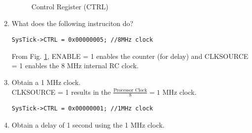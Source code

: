 \documentclass[journal,12pt,twocolumn]{IEEEtran}
\renewcommand\thesection{\arabic{section}}
\renewcommand\thesubsection{\thesection.\arabic{subsection}}
\begin{document}
\begin{enumerate}[label=\thesubsection.\arabic*.,ref=\thesubsection.\theenumi]
\begin{figure}[!ht]
\caption{Control Register (CTRL)}
\label{fig:systick_ctrl}
\end{figure}
\item What does the following instruciton do?
\begin{lstlisting}
SysTick->CTRL = 0x00000005;	//8MHz clock
\end{lstlisting}
\solution From Fig. \ref{fig:systick_ctrl}, ENABLE = 1 enables the counter (for delay) and CLKSOURCE = 1 enables the 8 MHz internal RC clock.
\item Obtain a 1 MHz clock. 
\\
\solution CLKSOURCE = 1 results in the $\frac{\text{Processor Clock}}{8} = 1$ MHz clock.
\begin{lstlisting}
SysTick->CTRL = 0x00000001;	//1MHz clock
\end{lstlisting}
\item Obtain a delay of 1 second using the 1 MHz clock.

\end{enumerate}
\end{document}
